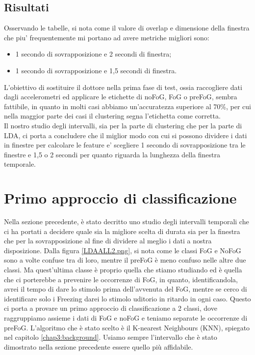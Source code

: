 \subsection{Risultati}
Osservando le tabelle, si nota come il valore di overlap e dimensione della finestra che piu' frequentemente mi portano ad avere metriche migliori sono:
\begin{itemize}
	\item 1 secondo di sovrapposizione e 2 secondi di finestra;
	\item 1 secondo di sovrapposizione e 1,5 secondi di finestra.
\end{itemize}
L'obiettivo di sostituire il dottore nella prima fase di test, ossia raccogliere dati dagli accelerometri ed applicare le etichette di noFoG, FoG o preFoG, sembra fattibile, in quanto in molti casi abbiamo un'accuratezza superiore al 70\%, per cui nella maggior parte dei casi il clustering segna l'etichetta come corretta.\\
Il nostro studio degli intervalli, sia per la parte di clustering che per la parte di LDA, ci porta a concludere che il miglior modo con cui si possono dividere i dati in finestre per calcolare le feature e' scegliere 1 secondo di sovrapposizione tra le finestre e 1,5 o 2 secondi per quanto riguarda la lunghezza della finestra temporale.

\section{Primo approccio di classificazione}
Nella sezione precedente, è stato decritto uno studio degli intervalli temporali che ci ha portati a decidere quale sia la migliore scelta di durata sia per la finestra che per la sovrapposizione al fine di dividere al meglio i dati a nostra disposizione. Dalla figura \ref{LDAALL2.png}, si nota come le classi FoG e NoFoG sono a volte confuse tra di loro, mentre il preFoG è meno confuso nelle altre due classi. Ma quest'ultima classe è proprio quella che stiamo studiando ed è quella che ci porterebbe a prevenire le occorrenze di FoG, in quanto, identificandola, avrei il tempo di dare lo stimolo prima dell'avvenuta del FoG, mentre se cerco di identificare solo i Freezing darei lo stimolo uditorio in ritardo in ogni caso. Questo ci porta a provare un primo approccio di classificazione a 2 classi, dove raggruppiamo assieme i dati di FoG e noFoG e teniamo separate le occorrenze di preFoG. L'algoritmo che è stato scelto è il K-nearest Neighbours (KNN), spiegato nel capitolo \ref{chap3:background}. Usiamo sempre l'intervallo che è stato dimostrato nella sezione precedente essere quello più affidabile.\\


